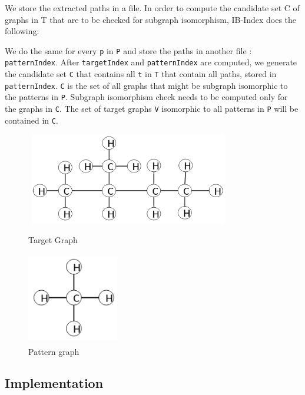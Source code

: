 \documentclass{l4proj}
\theoremstyle{definition}
\begin{document}
        We store the extracted paths in a file. In order to compute the candidate set C of graphs in T that are to be checked for subgraph isomorphism, IB-Index does the following:

        We do the same for every \texttt{p} in \texttt{P} and store the paths in another file : \texttt{patternIndex}. After \texttt{targetIndex} and \texttt{patternIndex} are computed, we generate the candidate set \texttt{C} that contains all \texttt{t} in \texttt{T} that contain all paths, stored in \texttt{patternIndex}. \texttt{C} is the set of all graphs that might be subgraph isomorphic to the patterns in \texttt{P}. Subgraph isomorphism check needs to be computed only for the graphs in \texttt{C}. The set of target graphs  \texttt{V} isomorphic to all patterns in  \texttt{P} will be contained in  \texttt{C}.\newline

\begin{figure}[h]
\centering
\begin{minipage}{.5\textwidth}
  \centering
  \includegraphics[height=4cm,width=9cm]{C5H11.png}
  \caption{Target Graph}
  \label{C5H11}
\end{minipage}%
\begin{minipage}{.5\textwidth}
  \centering
  \includegraphics[height=4cm,width=4cm]{CH3.png}
  \caption{Pattern graph}
  \label{CH3}
\end{minipage}
\end{figure}

         
\subsection{Implementation}
\end{document}

